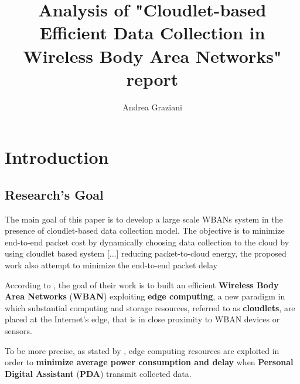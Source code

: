 \documentclass[sigchi]{acmart}
\begin{document}
\title{Analysis of "Cloudlet-based Efficient Data Collection in Wireless Body Area Networks" report}

\author{Andrea Graziani}

\renewcommand{\shortauthors}{Andrea Graziani (0273395)}

\maketitle

\section{Introduction}

\subsection{Research's Goal}

\vspace{0.3cm}

\begin{quoting}[font=itshape, begintext={``}, endtext={''\cite[par.~1.4]{MSAReport}}]
The main goal of this paper is to develop a large scale WBANs system in the presence of cloudlet-based data collection model. The objective is to minimize end-to-end packet cost by dynamically choosing data collection to the cloud by using cloudlet based system [...] reducing packet-to-cloud energy, the proposed work also attempt to minimize the end-to-end packet delay
\end{quoting}

\vspace{0.3cm}

According to \citet{MSAReport}, the goal of their work is to built an efficient \textbf{Wireless Body Area Networks} (\textbf{WBAN}) exploiting \textbf{edge computing}, a new paradigm in which substantial computing and storage resources, referred to as \textbf{cloudlets}, are placed at the Internet's edge, that is in close proximity to WBAN devices or sensors.\cite{TheEmergenceOfEdgeComputing}

To be more precise, as stated by \citet{MSAReport}, edge computing resources are exploited in order to \textbf{minimize average power consumption and delay} when \textbf{Personal Digital Assistant} (\textbf{PDA}) transmit collected data.
\end{document}
